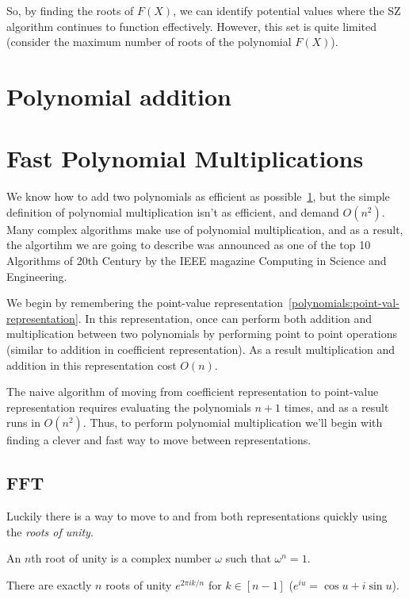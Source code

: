 So, by finding the roots of $F(X)$, we can identify potential values where 
the SZ algorithm continues to function effectively. 
However, this set is quite limited (consider the maximum number of roots of the polynomial $F(X)$).

\section{Polynomial addition}\label{polynomials:addition}
\section{Fast Polynomial Multiplications}\label{polynomial:multiplication}\label{section:fft}

We know how to add two polynomials as efficient as possible~\ref{polynomials:addition},
but the simple definition of polynomial multiplication isn't as efficient, and demand $O(n^2)$.
Many complex algorithms make use of polynomial multiplication, and as a result, the algortihm 
we are going to describe was announced as one of the top 10 Algorithms of 20th
Century by the IEEE magazine Computing in Science and Engineering.\cite{814652}


We begin by remembering the point-value representation~\ref{polynomials:point-val-representation}.
In this representation, once can perform both addition and multiplication between two polynomials 
by performing point to point operations (similar to addition in coefficient representation).
As a result multiplication and addition in this representation cost $O(n)$.


The naive algorithm of moving from coefficient representation to point-value representation
requires evaluating the polynomials $n+1$ times, and as a result runs in $O(n^2)$.
Thus, to perform polynomial multiplication we'll begin with finding a clever and fast way to move between representations.
\subsection{FFT}
Luckily there is a way to move to and from both representations quickly using the \emph{roots of unity}.

\begin{definition}
An $n$th root of unity is a complex number $\omega$ such that
$\omega^n =1$.
\end{definition}

There are exactly $n$ roots of unity $e^{2\pi i k/n}$ for $k\in[n-1]$ 
($e^{iu}= \cos{u}+i \sin{u}$).

